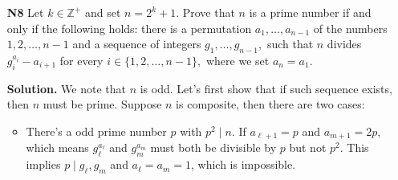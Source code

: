 \documentclass[11pt,a4paper]{article}
\begin{document}
\begin{enumerate}
    Now we have the next one: 
    \begin{lemma}
    	$S_{a^2} \equiv 2E_a + 2aO_a$
    \end{lemma}
    \begin{proof}
    	Again we have the following expansion: 
    	\begin{equation}
    		S_{a^2} = \sum^{p-1}_{j=1}\frac{a^{2j}}{j}
    		= \sum_{j=1}^{(p - 1)/ 2} \left(\frac{a^{2j}}{j} + \frac{a^{2j + (p - 1)}}{(p - 1)/ 2 + j}\right)
    		\equiv \sum_{j=1}^{(p - 1)/ 2} a^{2j}\left(\frac{1}{j} + \frac{1}{-\frac 12 + j}\right)
    	\end{equation}
        which can then be decomposed into the following: 
        \begin{equation}
        	\sum_{j=1}^{(p - 1)/ 2} \frac{a^{2j}}{j}
        	=2\sum_{j=1}^{(p - 1)/ 2} \frac{a^{2j}}{2j}
        	=2E_a
        \end{equation}
        and also 
        \begin{equation}
        	\sum_{j=1}^{(p - 1)/ 2} \frac{a^{2j}}{-\frac 12 + j}
        	\equiv \sum_{j=1}^{(p - 1)/ 2} \frac{2a^{2j}}{2j - 1}
        	=2a\sum_{j=1}^{(p - 1)/ 2} \frac{a^{2j - 1}}{2j - 1}
        	=2aO_a
        \end{equation}
    \end{proof}
    Therefore considering $a = 2$ we have 
    \begin{equation}
    	S_3 + S_4 - 3S_2
    	\equiv (E_2 - O_2) + (2E_2 + 2\cdot 2\cdot O_2) - 3(E_2 + O_2)
    	= 0
    \end{equation}
    as desired. 
	

	\item [\textbf{N8}] Let $k \in \mathbb{Z}^+$ and set $n=2^k+1.$ Prove that $n$ is a prime number if and only if the following holds: there is a permutation $a_{1},\ldots,a_{n-1}$ of the numbers $1,2, \ldots, n-1$ and a sequence of integers $g_{1},\ldots,g_{n-1},$ such that $n$ divides $g^{a_i}_i - a_{i+1}$ for every $i \in \{1,2,\ldots,n-1\},$ where we set $a_n = a_1.$
	
	\textbf{Solution.}
	We note that $n$ is odd. 
	Let's first show that if such sequence exists, then $n$ must be prime. 
	Suppose $n$ is composite, then there are two cases: 
	\begin{itemize}
		\item There's a odd prime number $p$ with $p^2\mid n$. 
		If $a_{\ell+1}=p$ and $a_{m+1}=2p$, which means $g_{\ell}^{a_{\ell}}$ and $g_m^{a_m}$ must both be divisible by $p$ but not $p^2$. This implies $p\mid g_{\ell}, g_m$ and $a_{\ell}=a_m=1$, which is impossible. 
		

\end{itemize}
\end{enumerate}
\end{document}

